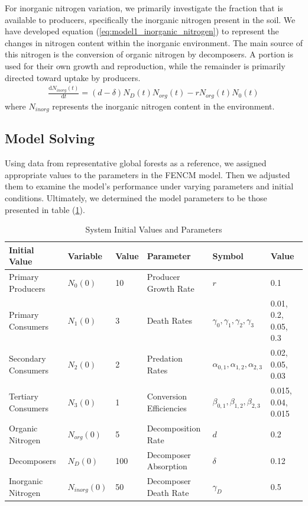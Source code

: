 \documentclass{mcmthesis}
\begin{document}
For inorganic nitrogen variation, we primarily investigate the fraction that is available to producers, specifically the inorganic nitrogen present in the soil. We have developed equation (\ref{eq:model1_inorganic_nitrogen}) to represent the changes in nitrogen content within the inorganic environment. The main source of this nitrogen is the conversion of organic nitrogen by decomposers. A portion is used for their own growth and reproduction, while the remainder is primarily directed toward uptake by producers.
\begin{align}
    \displaystyle 
    \frac{\mathrm{d}N_{inorg}(t)}{\mathrm{d}t} = \left( d - \delta \right) N_D(t) N_{org}(t) - r N_{org}(t) N_0(t) 
    \label{eq:model1_inorganic_nitrogen}
\end{align}
where $N_{inorg}$ represents the inorganic nitrogen content in the environment.

\subsection{Model Solving}
Using data from representative global forests as a reference, we assigned appropriate values to the parameters in the FENCM model. Then we adjusted them to examine the model's performance under varying parameters and initial conditions. Ultimately, we determined the model parameters to be those presented in table (\ref{tab:model1_initial_values}).
\begin{table}[H]
\centering
\caption{System Initial Values and Parameters}
\scriptsize
\label{tab:model1_initial_values}
\begin{tabular}{lll|lll}
\hline
\textbf{Initial Value} & \textbf{Variable} & \textbf{Value} & \textbf{Parameter} & \textbf{Symbol} & \textbf{Value} \\
\hline
Primary Producers & $N_0(0)$ & 10 & Producer Growth Rate & $r$ & 0.1 \\
Primary Consumers & $N_1(0)$ & 3 & Death Rates & $\gamma_0,\gamma_1,\gamma_2,\gamma_3$ & 0.01, 0.2, 0.05, 0.3 \\
Secondary Consumers & $N_2(0)$ & 2 & Predation Rates & $\alpha_{0,1},\alpha_{1,2},\alpha_{2,3}$ & 0.02, 0.05, 0.03 \\
Tertiary Consumers & $N_3(0)$ & 1 & Conversion Efficiencies & $\beta_{0,1},\beta_{1,2},\beta_{2,3}$ & 0.015, 0.04, 0.015 \\
Organic Nitrogen & $N_{org}(0)$ & 5 & Decomposition Rate & $d$ & 0.2 \\
Decomposers & $N_D(0)$ & 100 & Decomposer Absorption & $\delta$ & 0.12 \\
Inorganic Nitrogen & $N_{inorg}(0)$ & 50 & Decomposer Death Rate & $\gamma_D$ & 0.5 \\
\hline
\end{tabular}
\end{table}
\end{document}
